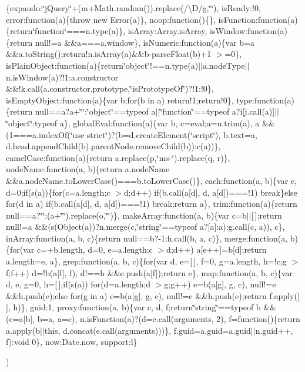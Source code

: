 {\begin{DoxyParamCaption}
\item[{}]{\{expando\+:\char`\"{}j\+Query\char`\"{}+(m+\+Math.\+random()).\+replace(/\textbackslash{}\+D/g,\char`\"{}\char`\"{}), is\+Ready\+:!0, error\+:function(a)\{throw new Error(a)\}, noop\+:function()\{\}, is\+Function\+:function(a)\{return\char`\"{}function\char`\"{}===n.\+type(a)\}, is\+Array\+:\+Array.\+is\+Array, is\+Window\+:function(a)\{return null!=a \&\&a===a.\+window\}, is\+Numeric\+:function(a)\{var b=a \&\&a.\+to\+String();return!n.\+is\+Array(a)\&\&b-\/parse\+Float(b)+1 $>$=0\}, is\+Plain\+Object\+:function(a)\{return\char`\"{}object\char`\"{}!==n.\+type(a)$\vert$$\vert$a.\+node\+Type$\vert$$\vert$n.\+is\+Window(a)?!1\+:a.\+constructor \&\&!k.\+call(a.\+constructor.\+prototype,\char`\"{}is\+Prototype\+Of\char`\"{})?!1\+:!0\}, is\+Empty\+Object\+:function(a)\{var b;for(b in a) return!1;return!0\}, type\+:function(a)\{return null==a?a+\char`\"{}\char`\"{}\+:\char`\"{}object\char`\"{}==typeof a$\vert$$\vert$\char`\"{}function\char`\"{}==typeof a?i\mbox{[}j.\+call(a)\mbox{]}$\vert$$\vert$\char`\"{}object\char`\"{}\+:typeof a\}, global\+Eval\+:function(a)\{var b, c=eval;a=n.\+trim(a), a \&\&(1===a.\+index\+Of(\char`\"{}use strict\char`\"{})?(b=d.\+create\+Element(\char`\"{}script\char`\"{}), b.\+text=a, d.\+head.\+append\+Child(b).\+parent\+Node.\+remove\+Child(b))\+:c(a))\}, camel\+Case\+:function(a)\{return a.\+replace(p,\char`\"{}ms-\/\char`\"{}).\+replace(q, r)\}, node\+Name\+:function(a, b)\{return a.\+node\+Name \&\&a.\+node\+Name.\+to\+Lower\+Case()===b.\+to\+Lower\+Case()\}, each\+:function(a, b)\{var c, d=0;if(s(a))\{for(c=a.\+length;c $>$d;d++) if(b.\+call(a\mbox{[}d\mbox{]}, d, a\mbox{[}d\mbox{]})===!1) break\}else for(d in a) if(b.\+call(a\mbox{[}d\mbox{]}, d, a\mbox{[}d\mbox{]})===!1) break;return a\}, trim\+:function(a)\{return null==a?\char`\"{}\char`\"{}\+:(a+\char`\"{}\char`\"{}).\+replace(o,\char`\"{}\char`\"{})\}, make\+Array\+:function(a, b)\{var c=b$\vert$$\vert$\mbox{[}$\,$\mbox{]};return null!=a \&\&(s(\+Object(a))?n.\+merge(c,\char`\"{}string\char`\"{}==typeof a?\mbox{[}a\mbox{]}\+:a)\+:g.\+call(c, a)), c\}, in\+Array\+:function(a, b, c)\{return null==b?-\/1\+:h.\+call(b, a, c)\}, merge\+:function(a, b)\{for(var c=+b.\+length, d=0, e=a.\+length;c $>$d;d++) a\mbox{[}e++\mbox{]}=b\mbox{[}d\mbox{]};return a.\+length=e, a\}, grep\+:function(a, b, c)\{for(var d, e=\mbox{[}$\,$\mbox{]}, f=0, g=a.\+length, h=!c;g $>$f;f++) d=!b(a\mbox{[}f\mbox{]}, f), d!==h \&\&e.\+push(a\mbox{[}f\mbox{]});return e\}, map\+:function(a, b, c)\{var d, e, g=0, h=\mbox{[}$\,$\mbox{]};if(s(a)) for(d=a.\+length;d $>$g;g++) e=b(a\mbox{[}g\mbox{]}, g, c), null!=e \&\&h.\+push(e);else for(g in a) e=b(a\mbox{[}g\mbox{]}, g, c), null!=e \&\&h.\+push(e);return f.\+apply(\mbox{[}$\,$\mbox{]}, h)\}, guid\+:1, proxy\+:function(a, b)\{var c, d, f;return\char`\"{}string\char`\"{}==typeof b \&\&(c=a\mbox{[}b\mbox{]}, b=a, a=c), n.\+is\+Function(a)?(d=e.\+call(arguments, 2), f=function()\{return a.\+apply(b$\vert$$\vert$this, d.\+concat(e.\+call(arguments)))\}, f.\+guid=a.\+guid=a.\+guid$\vert$$\vert$n.\+guid++, f)\+:void 0\}, now\+:\+Date.\+now, support\+:l\}}
\end{DoxyParamCaption}
)}\hypertarget{jquery-2_82_81_8min_8js_a798d2452a6cada224fa212d35d4e0325}{}\label{jquery-2_82_81_8min_8js_a798d2452a6cada224fa212d35d4e0325}
